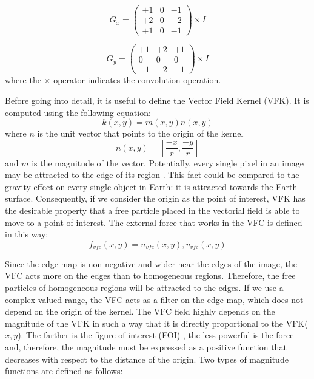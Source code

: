 {	\begin{equation}
	G_{x} =\begin{pmatrix}
	+1 & 0 & -1 \\
	+2 & 0 & -2 \\
	+1 & 0 & -1 \end{pmatrix} \times I
	\end{equation}
	
	\medskip 
	
	\begin{equation}
	G_{y} = \begin{pmatrix}
	+1 & +2 & +1 \\
	0 & 0 & 0 \\
	-1 & -2 & -1 \end{pmatrix} \times I
	\end{equation}
	where the $\times$ operator indicates the convolution operation.
	
	Before going into detail, it is useful to define the Vector Field Kernel (VFK). It is computed using the following equation:
	\begin{equation}
	k ( x,y ) =m(x,y)n(x,y)
	\end{equation}
	where $n$ is the unit vector that points to the origin of the kernel	
	\begin{equation}
	n ( x,y ) = [\frac{-x}{r} , \frac{-y}{r} ]
	\end{equation}
	and $m$ is the magnitude of the vector. Potentially, every single pixel in an image may be attracted to the edge of its region \cite{Bing}. This fact could be compared to the gravity effect on every single object in Earth: it is attracted towards the Earth surface. Consequently, if we consider the origin as the point of interest, VFK has the desirable property that a free particle placed in the vectorial field is able to move to a point of interest. The external force that works in the VFC is defined in this way:
	\begin{equation}
	{f} _{vfc} ( x,y ) = {u} _{vfc} ( x,y ) , {v} _{vfc} (x,y)
	\end{equation}
	
	Since the edge map is non-negative and wider near the edges of the image, the VFC acts more on the edges than to homogeneous regions. Therefore, the free particles of homogeneous regions will be attracted to the edges. If we use a complex-valued range, the VFC acts as a filter on the edge map, which does not depend on the origin of the kernel. The VFC field highly depends on the magnitude of the VFK in such a way that it is directly proportional to the VFK($x, y$). 
	The farther is the figure of interest (FOI) \cite{Bing}, the less powerful is the force and, therefore, the magnitude must be expressed as a positive function that decreases with respect to the distance of the origin. Two types of magnitude functions are defined as follows:
	
}
